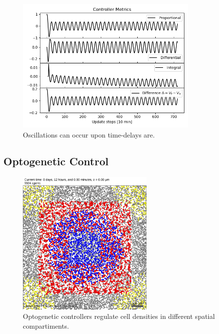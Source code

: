 %
%
\begin{frame}{\insertsubsubsection}
	\begin{figure}
		\centering
		\includegraphics[width=0.8\textwidth]{media/TimeDelayOscillations}
		\caption{Oscillations can occur upon time-delays are.}
	\end{figure}
\end{frame}
%
%
\subsection{Optogenetic Control}
\label{subsec:concepts-optogenetic-control}
\begin{frame}{\insertsubsubsection}
	\begin{figure}
		\centering
		\includegraphics[width=0.6\textwidth]{media/SpatialDensityControl}
		\caption{Optogenetic controllers regulate cell densities in different spatial compartiments.}
	\end{figure}
\end{frame}